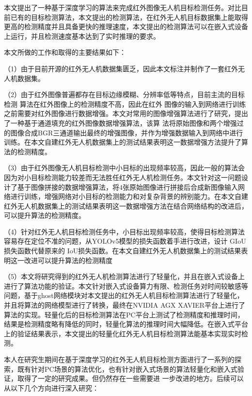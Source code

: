 \begin{conclusions}

本文提出了一种基于深度学习的算法来完成红外图像无人机目标检测任务。对比目前已有的目标检测算法，本文提出的检测算法，在红外无人机目标数据集上能取得更高的检测精度并且具备更快的推理速度，本文提出的检测算法可以在嵌入式设备上运行，并且检测速度基本达到了实时推理的要求。

本文所做的工作和取得的主要结果如下：

（1）由于目前开源的红外无人机数据集匮乏，因此本文标注并制作了一套红外无人机数据集。

（2）由于红外图像普遍都存在目标边缘模糊、分辨率低等特点，目前主流的目标检测
算法在红外图像上的检测精度不高，因此在红外
图像的输入到网络进行训练之前需要对红外图像进行数据增强。本文对常用的图像增强算法进行了研究，提出了一种基于通道填充的红外图像数据增强算法，该算
法将原始图像和两个增强过的图像合成BGR三通道输出最终的增强图像，并作为增强数据输入到网络中进行训练。在本文自建红外无人机数据集上的测试结果表明这一数据增强方法提升了算法的检测精度。

（3）由于红外图像无人机目标检测中小目标的出现频率较高，因此一般的算法会因为对小目标检测能力较差而无法胜任红外无人机检测任务。本文针对这一问题设计了基于图像拼接的数据增强算法，将4张原始图像进行拼接后合成新图像输入网络进行训练，增强网络对小目标的检测能力和对复杂背景的辨别能力。在本文自建红外无人机数据集上的测试结果表明这一数据增强方法在结合网络结构的改进后，可以提升算法的检测精度。

（4）针对红外无人机目标检测任务中，小目标出现频率较高，使得目标检测算法容易存在定位不准的问题，从YOLOv5模型的损失函数着手进行改进，设计 GIoU 损失函数代替原来的
IoU损失函数。在本文自建红外无人机数据集上的测试结果表明这一改进可以提升算法的检测精度


（5）本文将研究得到的红外无人机检测算法进行了轻量化，并且在嵌入式设备上进行了算法功能的验证。本文针对嵌入式设备算力有限、检测任务对时间较敏感等问题，基于ghost网络模块对本文提出的红外无人机目标检测算法进行了轻量化，并且将算法的网络模型进行了转换，最终在NVIDIA AGX XAVIER平台上进行了算法的实现。轻量化后的目标检测算法在PC平台上测试了检测精度和推理时间，结果是检测精度略有降低的同时，轻量化算法的推理时间大幅降低。在嵌入式平台上的验证结果表示，本文提出的轻量化红外无人机目标检测算法能基本实现实时检测。

本人在研究生期间在基于深度学习的红外无人机目标检测方面进行了一系列的探
索，既有针对PC场景的算法优化，也有针对嵌入式场景的算法轻量化和嵌入式验证，取得了一定的研究成果。但仍然存在一些需要进
一步改进的地方。后续可以从以下几个方向进行深入研究：


\end{conclusions}

